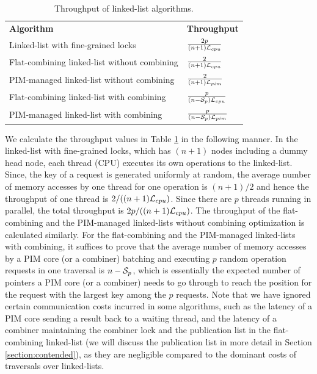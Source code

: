 \renewcommand{\arraystretch}{1.8}
\begin{table}[ht!]
\begin{center}
    \begin{tabular}{| >{\small}l | l |}
    \hline
    \textbf{Algorithm} & \textbf{Throughput}\\ \hhline{|=|=|}
    Linked-list with fine-grained locks & ${2p \over (n+1)\mathcal{L}_{cpu}}$ \\ \hline
    Flat-combining linked-list without combining & ${2 \over (n+1)\mathcal{L}_{cpu}}$ \\ \hline
    PIM-managed linked-list without combining & ${2 \over (n+1)\mathcal{L}_{pim}}$ \\ \hline
    Flat-combining linked-list with combining & ${p \over (n-\mathcal{S}_{p})\mathcal{L}_{cpu}}$ \\ \hline
    PIM-managed linked-list with combining & ${p \over (n-\mathcal{S}_{p})\mathcal{L}_{pim}}$ \\ \hline
    \end{tabular}
\end{center}
\caption{Throughput of linked-list algorithms.}
\label{tab:linkedlist}
\end{table}

We calculate the throughput values in Table \ref{tab:linkedlist} in the following manner. 
In the linked-list with fine-grained locks, which has $(n+1)$ nodes including 
a dummy head node, each thread (CPU) executes its own operations to the linked-list. 
Since, the key of a request is generated uniformly at random, 
the average number of memory accesses by one thread for one operation is $(n+1)/2$ 
and hence the throughput of one thread is $2/((n+1)\mathcal{L}_{cpu})$. 
Since there are $p$ threads running in parallel, the total throughput is $2p/((n+1)\mathcal{L}_{cpu})$. 
The throughput of the flat-combining and the PIM-managed linked-lists without combining optimization 
is calculated similarly. 
For the flat-combining and the PIM-managed linked-lists with combining, it suffices to prove that
the average number of memory accesses by a PIM core (or a combiner) batching and executing 
$p$ random operation requests in one traversal is $n - \mathcal{S}_{p}$, 
which is essentially the expected number of pointers a PIM core (or a combiner) 
needs to go through to reach the position for the request with the largest key among the $p$ requests. 
Note that we have ignored certain communication costs incurred in some algorithms, 
such as the latency of a PIM core sending a result back to a waiting thread, 
and the latency of a combiner maintaining the combiner lock and the publication list in the flat-combining 
linked-list (we will discuss the publication list in more detail in Section \ref{section:contended}), 
as they are negligible compared to the dominant costs of traversals over linked-lists.
 
